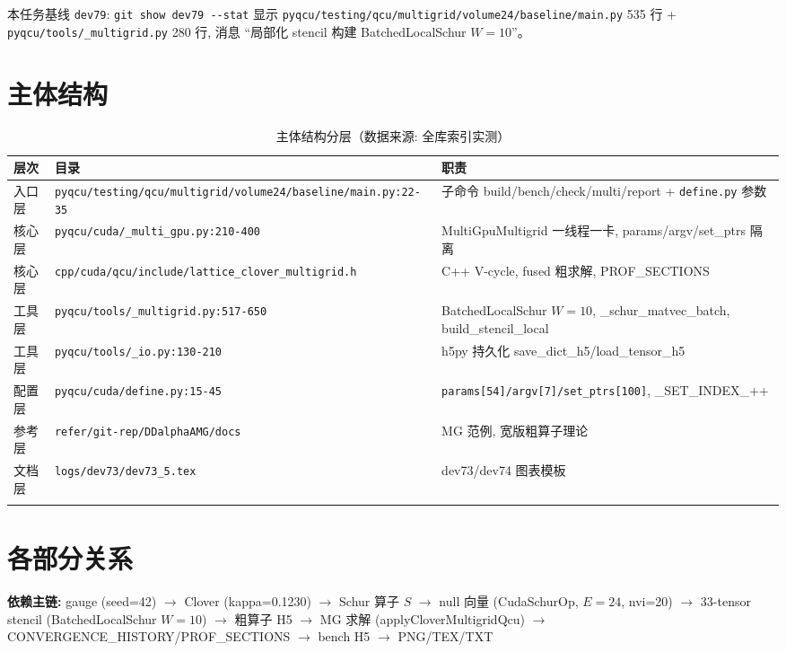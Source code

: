 \documentclass[UTF8]{ctexart}
\begin{document}
\noindent 本任务基线 \texttt{\nolinkurl{dev79}}: \texttt{\nolinkurl{git show dev79 --stat}} 显示 \texttt{\nolinkurl{pyqcu/testing/qcu/multigrid/volume24/baseline/main.py}} 535 行 + \texttt{\nolinkurl{pyqcu/tools/_multigrid.py}} 280 行, 消息 ``局部化 stencil 构建 BatchedLocalSchur $W=10$''。

\section{主体结构}
\begin{xltabular}{\textwidth}{llX}
\toprule
\textcolor{struct}{层次} & 目录 & \textcolor{struct}{职责} \\
\midrule
\endhead
入口层 & \texttt{\nolinkurl{pyqcu/testing/qcu/multigrid/volume24/baseline/main.py:22-35}} & 子命令 build/bench/check/multi/report + \texttt{\nolinkurl{define.py}} 参数 \\
核心层 & \texttt{\nolinkurl{pyqcu/cuda/_multi_gpu.py:210-400}} & MultiGpuMultigrid 一线程一卡, params/argv/set\_ptrs 隔离 \\
核心层 & \texttt{\nolinkurl{cpp/cuda/qcu/include/lattice_clover_multigrid.h}} & C++ V-cycle, fused 粗求解, PROF\_SECTIONS \\
工具层 & \texttt{\nolinkurl{pyqcu/tools/_multigrid.py:517-650}} & BatchedLocalSchur $W=10$, \_schur\_matvec\_batch, build\_stencil\_local \\
工具层 & \texttt{\nolinkurl{pyqcu/tools/_io.py:130-210}} & h5py 持久化 save\_dict\_h5/load\_tensor\_h5 \\
配置层 & \texttt{\nolinkurl{pyqcu/cuda/define.py:15-45}} & \texttt{\nolinkurl{params[54]/argv[7]/set_ptrs[100]}}, \_SET\_INDEX\_++ \\
参考层 & \texttt{\nolinkurl{refer/git-rep/DDalphaAMG/docs}} & MG 范例, 宽版粗算子理论 \\
文档层 & \texttt{\nolinkurl{logs/dev73/dev73_5.tex}} & dev73/dev74 图表模板 \\
\bottomrule
\caption{主体结构分层（数据来源: 全库索引实测）}
\end{xltabular}

\section{各部分关系}
\begin{keybox}
\textbf{依赖主链:} \textcolor{relation}{gauge (seed=42) $\to$ Clover (kappa=0.1230) $\to$ Schur 算子 $S$ $\to$ null 向量 (CudaSchurOp, $E=24$, nvi=20) $\to$ 33-tensor stencil (BatchedLocalSchur $W=10$) $\to$ 粗算子 H5 $\to$ MG 求解 (applyCloverMultigridQcu) $\to$ CONVERGENCE\_HISTORY/PROF\_SECTIONS $\to$ bench H5 $\to$ PNG/TEX/TXT}
\end{keybox}
\end{document}
